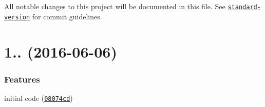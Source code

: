 All notable changes to this project will be documented in this file. See \href{https://github.com/conventional-changelog/standard-version}{\tt standard-\/version} for commit guidelines.

\label{_1.0.0}%
 \section*{1.. (2016-\/06-\/06)}

\subsubsection*{Features}


\begin{DoxyItemize}
\item initial code (\href{https://github.com/nexdrew/which-module/commit/08074cd}{\tt 08074cd}) 
\end{DoxyItemize}
